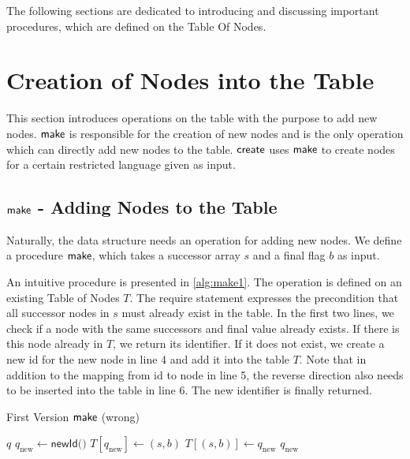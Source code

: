 \par 

The following sections are dedicated to introducing and discussing important procedures, which are defined on the Table Of Nodes. 

\section{Creation of Nodes into the Table}
This section introduces operations on the table with the purpose to add new nodes. $\operatorname{\textsf{make}}$ is responsible for the creation of new nodes and is the only operation which can directly add new nodes to the table. $\operatorname{\textsf{create}}$ uses $\operatorname{\textsf{make}}$ to create nodes for a certain restricted language given as input.

\subsection{$\operatorname{\textsf{make}}$ - Adding Nodes to the Table}
Naturally, the data structure needs an operation for adding new nodes. We define a procedure $\operatorname{\textsf{make}}$, which takes a successor array $s$ and a final flag $b$ as input. 

An intuitive procedure is presented in \autoref{alg:make1}.
The operation is defined on an existing Table of Nodes $T$.
The require statement expresses the precondition that all successor nodes in $s$ must already exist in the table. In the first two lines, we check if a node with the same successors and final value already exists. If there is this node already in $T$, we return its identifier. If it does not exist, we create a new id for the new node in line 4 and add it into the table $T$. Note that in addition to the mapping from id to node in line 5, the reverse direction also needs to be inserted into the table in line 6. The new identifier is finally returned.

\begin{algorithm}
\caption{First Version $\operatorname{\textsf{make}}$ (wrong)}\label{alg:make1}
\begin{algorithmic}[1]\smallskip
{}
\Return $q$
\Else
\State $q_{\text{new}} \gets \textsf{newId()}$
\State $T[q_{\text{new}}] \gets (s,b)$
\State $T[(s,b)] \gets q_{\text{new}}$
\Return $q_{\text{new}}$
\EndIf
\end{algorithmic}
\end{algorithm}


